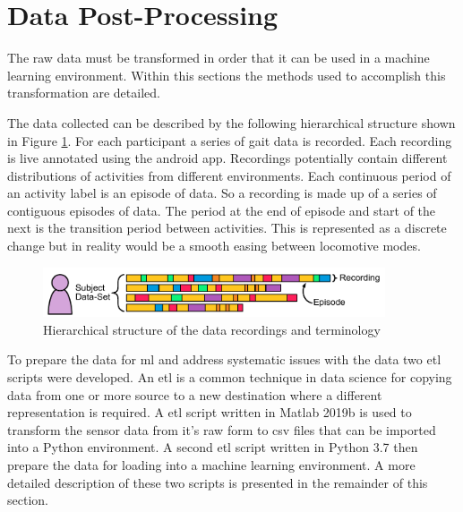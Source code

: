 

\section{Data Post-Processing}
The raw data must be transformed in order that it can be used in a machine learning environment. Within this sections the methods used to accomplish this transformation are detailed.

The data collected can be described by the following hierarchical structure shown in Figure \ref{fig:methods-data-hierachy}. For each participant a series of gait data is recorded. Each recording is live annotated using the android app. Recordings potentially contain different distributions of activities from different environments. Each continuous period of an activity label is an episode of data. So a recording is made up of a series of contiguous episodes of data. The period at the end of episode and start of the next is the transition period between activities. This is represented as a discrete change but in reality would be a smooth easing between locomotive modes.

\begin{figure}[hbt]
    \centering
    \includegraphics[width=0.9\textwidth]{content/3-Methods/Data_Terminology.pdf}
    \caption{Hierarchical structure of the data recordings and terminology}
    \label{fig:methods-data-hierachy}
\end{figure}

To prepare the data for \acrshort{ml} and address systematic issues with the data two \acrfull{etl} scripts were developed. An \acrshort{etl} is a common technique in data science for copying data from one or more source to a new destination where a different representation is required. A \acrshort{etl} script written in Matlab 2019b is used to transform the sensor data from it's raw form to \acrshort{csv} files that can be imported into a Python environment. A second \acrshort{etl} script written in Python 3.7 then prepare the data for loading into a machine learning environment. A more detailed description of these two scripts is presented in the remainder of this section.

